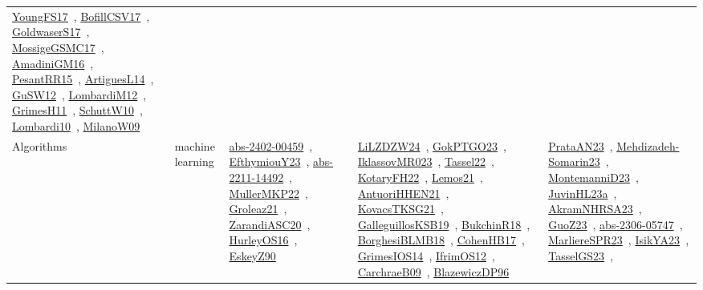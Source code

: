 {\begin{longtable}{lp{3cm}>{\raggedright\arraybackslash}p{6cm}>{\raggedright\arraybackslash}p{6cm}>{\raggedright\arraybackslash}p{8cm}}
\href{../works/YoungFS17.pdf}{YoungFS17}~\cite{YoungFS17}, \href{../works/BofillCSV17.pdf}{BofillCSV17}~\cite{BofillCSV17}, \href{../works/GoldwaserS17.pdf}{GoldwaserS17}~\cite{GoldwaserS17}, \href{../works/MossigeGSMC17.pdf}{MossigeGSMC17}~\cite{MossigeGSMC17}, \href{../works/AmadiniGM16.pdf}{AmadiniGM16}~\cite{AmadiniGM16}, \href{../works/PesantRR15.pdf}{PesantRR15}~\cite{PesantRR15}, \href{../works/ArtiguesL14.pdf}{ArtiguesL14}~\cite{ArtiguesL14}, \href{../works/GuSW12.pdf}{GuSW12}~\cite{GuSW12}, \href{../works/LombardiM12.pdf}{LombardiM12}~\cite{LombardiM12}, \href{../works/GrimesH11.pdf}{GrimesH11}~\cite{GrimesH11}, \href{../works/SchuttW10.pdf}{SchuttW10}~\cite{SchuttW10}, \href{../works/Lombardi10.pdf}{Lombardi10}~\cite{Lombardi10}, \href{../works/MilanoW09.pdf}{MilanoW09}~\cite{MilanoW09}\\
\index{machine learning}\index{Algorithms!machine learning}Algorithms & machine learning & \href{../works/abs-2402-00459.pdf}{abs-2402-00459}~\cite{abs-2402-00459}, \href{../works/EfthymiouY23.pdf}{EfthymiouY23}~\cite{EfthymiouY23}, \href{../works/abs-2211-14492.pdf}{abs-2211-14492}~\cite{abs-2211-14492}, \href{../works/MullerMKP22.pdf}{MullerMKP22}~\cite{MullerMKP22}, \href{../works/Groleaz21.pdf}{Groleaz21}~\cite{Groleaz21}, \href{../works/ZarandiASC20.pdf}{ZarandiASC20}~\cite{ZarandiASC20}, \href{../works/HurleyOS16.pdf}{HurleyOS16}~\cite{HurleyOS16}, \href{../works/EskeyZ90.pdf}{EskeyZ90}~\cite{EskeyZ90} & \href{../works/LiLZDZW24.pdf}{LiLZDZW24}~\cite{LiLZDZW24}, \href{../works/GokPTGO23.pdf}{GokPTGO23}~\cite{GokPTGO23}, \href{../works/IklassovMR023.pdf}{IklassovMR023}~\cite{IklassovMR023}, \href{../works/Tassel22.pdf}{Tassel22}~\cite{Tassel22}, \href{../works/KotaryFH22.pdf}{KotaryFH22}~\cite{KotaryFH22}, \href{../works/Lemos21.pdf}{Lemos21}~\cite{Lemos21}, \href{../works/AntuoriHHEN21.pdf}{AntuoriHHEN21}~\cite{AntuoriHHEN21}, \href{../works/KovacsTKSG21.pdf}{KovacsTKSG21}~\cite{KovacsTKSG21}, \href{../works/GalleguillosKSB19.pdf}{GalleguillosKSB19}~\cite{GalleguillosKSB19}, \href{../works/BukchinR18.pdf}{BukchinR18}~\cite{BukchinR18}, \href{../works/BorghesiBLMB18.pdf}{BorghesiBLMB18}~\cite{BorghesiBLMB18}, \href{../works/CohenHB17.pdf}{CohenHB17}~\cite{CohenHB17}, \href{../works/GrimesIOS14.pdf}{GrimesIOS14}~\cite{GrimesIOS14}, \href{../works/IfrimOS12.pdf}{IfrimOS12}~\cite{IfrimOS12}, \href{../works/CarchraeB09.pdf}{CarchraeB09}~\cite{CarchraeB09}, \href{../works/BlazewiczDP96.pdf}{BlazewiczDP96}~\cite{BlazewiczDP96} & \href{../works/PrataAN23.pdf}{PrataAN23}~\cite{PrataAN23}, \href{../works/Mehdizadeh-Somarin23.pdf}{Mehdizadeh-Somarin23}~\cite{Mehdizadeh-Somarin23}, \href{../works/MontemanniD23.pdf}{MontemanniD23}~\cite{MontemanniD23}, \href{../works/JuvinHL23a.pdf}{JuvinHL23a}~\cite{JuvinHL23a}, \href{../works/AkramNHRSA23.pdf}{AkramNHRSA23}~\cite{AkramNHRSA23}, \href{../works/GuoZ23.pdf}{GuoZ23}~\cite{GuoZ23}, \href{../works/abs-2306-05747.pdf}{abs-2306-05747}~\cite{abs-2306-05747}, \href{../works/MarliereSPR23.pdf}{MarliereSPR23}~\cite{MarliereSPR23}, \href{../works/IsikYA23.pdf}{IsikYA23}~\cite{IsikYA23}, \href{../works/TasselGS23.pdf}{TasselGS23}~\cite{TasselGS23}, 
\end{longtable}}
